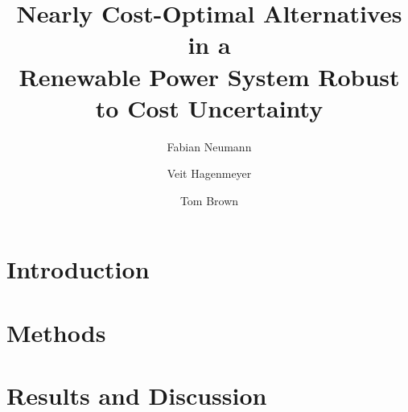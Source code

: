 \documentclass[1p,11pt]{elsarticle}
\begin{document}
\begin{frontmatter}

	\title{Nearly Cost-Optimal Alternatives in a \\ Renewable Power System Robust to Cost Uncertainty }
	
	\author[kitaddress]{Fabian Neumann}
	\author[kitaddress]{Veit Hagenmeyer}
	\author[kitaddress]{Tom Brown}
	\address[kitaddress]{Institute for Automation and Applied Informatics (IAI), Karlsruhe Institute of Technology (KIT), Hermann-von-Helmholtz-Platz 1, 76344, Eggenstein-Leopoldshafen, Germany}

	\begin{abstract}
		
	\end{abstract}


\end{frontmatter}

\begin{small}
	\tableofcontents
\end{small}



\section{Introduction}
\label{sec:intro}



\section{Methods}
\label{sec:methods}



\section{Results and Discussion}
\label{sec:results}
\end{document}
